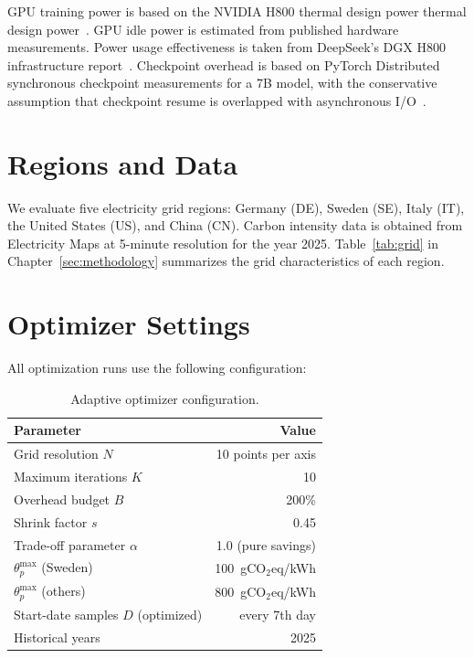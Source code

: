 GPU training power is based on the NVIDIA H800 thermal design power
thermal design power~\cite{h800_specs}.  GPU idle power is estimated
from published hardware
measurements.  Power usage effectiveness is taken from DeepSeek's DGX
H800 infrastructure
report~\cite{jegham_hungry_2025}.  Checkpoint overhead is based on PyTorch
Distributed synchronous checkpoint measurements for a 7B model, with the
conservative assumption that checkpoint resume is overlapped with asynchronous
I/O~\cite{pytorch_checkpoint}.

\section{Regions and Data}
\label{sec:regions-data}

We evaluate five electricity grid regions: Germany (DE), Sweden (SE), Italy
(IT), the United States (US), and China (CN).  Carbon intensity data is
obtained from Electricity Maps at 5-minute resolution for the year 2025.
Table~\ref{tab:grid} in Chapter~\ref{sec:methodology} summarizes the grid
characteristics of each region.

\section{Optimizer Settings}
\label{sec:optimizer-settings}

All optimization runs use the following configuration:

\begin{table}
  \centering
  \caption{Adaptive optimizer configuration.}
  \label{tab:optimizer-config}
  \small
  \begin{tabular}{lr}
    \toprule
    Parameter & Value \\
    \midrule
    Grid resolution $N$ & 10 points per axis \\
    Maximum iterations $K$ & 10 \\
    Overhead budget $B$ & 200\% \\
    Shrink factor $s$ & 0.45 \\
    Trade-off parameter $\alpha$ & 1.0 (pure savings) \\
    $\theta_p^{\max}$ (Sweden) & 100~gCO$_2$eq/kWh \\
    $\theta_p^{\max}$ (others) & 800~gCO$_2$eq/kWh \\
    Start-date samples $D$ (optimized) & every 7th day \\
    Historical years & 2025 \\
    \bottomrule
  \end{tabular}
\end{table}
